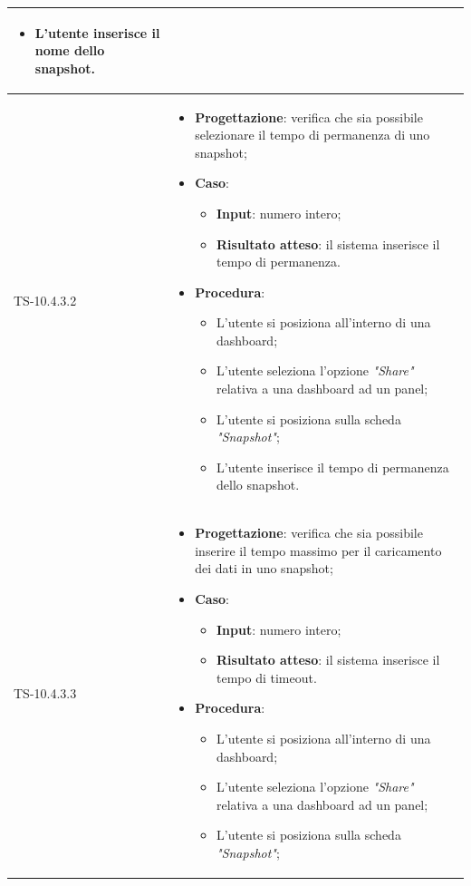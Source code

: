 \begin{longtable}{|C{2.5cm}|C{13cm}|}
\begin{itemize}
\begin{itemize}
		\item L'utente inserisce il nome dello snapshot.
	\end{itemize} 
\end{itemize}
	  \\
	\hline
	{TS-10.4.3.2} &
\begin{itemize}
	\item \textbf{Progettazione}: verifica che sia possibile selezionare il
	tempo di permanenza di uno snapshot;
	\item \textbf{Caso}: 
	\begin{itemize}
		\item \textbf{Input}: numero intero;
		\item \textbf{Risultato atteso}: il sistema inserisce il tempo di permanenza.
	\end{itemize}
	\item \textbf{Procedura}:
	\begin{itemize}
		\item L'utente si posiziona all'interno di una dashboard;
		\item L'utente seleziona l'opzione \emph{"Share"} relativa a una dashboard ad un panel;
		\item L'utente si posiziona sulla scheda \emph{"Snapshot"};
		\item L'utente inserisce il tempo di permanenza dello snapshot.
	\end{itemize} 
\end{itemize}
	  \\
	\hline
	{TS-10.4.3.3} & 
\begin{itemize}
	\item \textbf{Progettazione}: verifica che sia possibile inserire il tempo
	massimo per il caricamento dei dati in uno snapshot;
	\item \textbf{Caso}: 
	\begin{itemize}
		\item \textbf{Input}: numero intero;
		\item \textbf{Risultato atteso}: il sistema inserisce il tempo di timeout.
	\end{itemize}
	\item \textbf{Procedura}:
	\begin{itemize}
		\item L'utente si posiziona all'interno di una dashboard;
		\item L'utente seleziona l'opzione \emph{"Share"} relativa a una dashboard ad un panel;
		\item L'utente si posiziona sulla scheda \emph{"Snapshot"};

\end{itemize}
\end{itemize}
\end{longtable}
